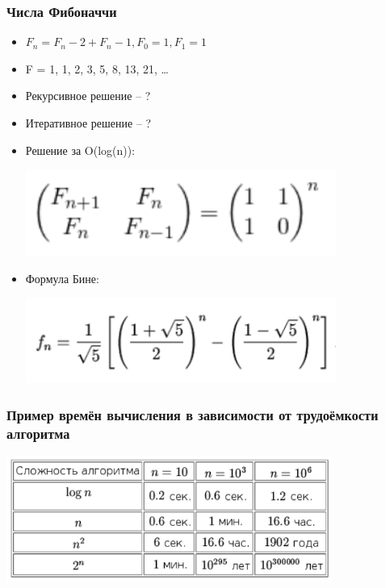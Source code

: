 \documentclass[xetex,mathserif,serif]{beamer}
\begin{document}
	\begin{frame}
		\frametitle{Числа Фибоначчи}
		\begin{itemize}
			\item $F_n = F_n-2 + F_n-1, F_0 = 1, F_1 = 1$
			\item F = 1, 1, 2, 3, 5, 8, 13, 21, …
			\item Рекурсивное решение – ?
			\item Итеративное решение – ?
			\item Решение за O(log(n)):
			\begin{center}
				\includegraphics[width=0.8\textwidth]{fibonacci_log_n.png}
			\end{center}
			\item Формула Бине:
			\begin{center}
				\includegraphics[width=0.8\textwidth]{fibonacci_bine.png}
			\end{center}
		\end{itemize}
	\end{frame}

	\begin{frame}
		\frametitle{Пример времён вычисления в зависимости от трудоёмкости алгоритма}
			\begin{center}
				\includegraphics[width=0.8\textwidth]{complexity-table.png}
			\end{center}		
	\end{frame}
\end{document}
